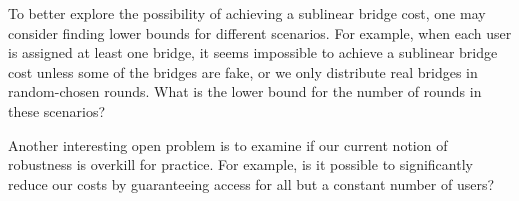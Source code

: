 \documentclass{sig-alternate-05-2015}
\begin{document}
To better explore the possibility of achieving a sublinear bridge cost, one may consider finding lower bounds for different scenarios. For example, when each user is assigned at least one bridge, it seems impossible to achieve a sublinear bridge cost unless some of the bridges are fake, or we only distribute real bridges in random-chosen rounds. What is the lower bound for the number of rounds in these scenarios?

Another interesting open problem is to examine if our current notion of robustness is overkill for practice. For example, is it possible to significantly reduce our costs by guaranteeing access for all but a constant number of users? %




%
\end{document}
